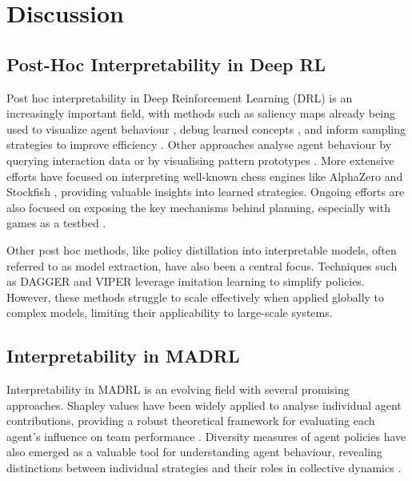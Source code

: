 \section{Discussion}

\subsection{Post-Hoc Interpretability in Deep RL}

Post hoc interpretability in Deep Reinforcement Learning (DRL) is an increasingly important field, with methods such as saliency maps already being used to visualize agent behaviour \cite{Greydanus2017VisualizingAU}, debug learned concepts \cite{Jaderberg2018HumanlevelPI, Hilton2020UnderstandingRV}, and inform sampling strategies to improve efficiency \cite{Bertoin2022LookWY}. Other approaches analyse agent behaviour by querying interaction data \cite{Sequeira2019InterestingnessEF} or by visualising pattern prototypes \cite{Ragodos2022ProtoXEA,Aliciolu2024UseBA}.  More extensive efforts have focused on interpreting well-known chess engines like AlphaZero \cite{McGrath_2022,lovering2022evaluation,hammersborg2023information,schut2023bridging,jenner2024evidencelearnedlookaheadchessplaying,Poupart2024ContrastiveSA} and Stockfish \cite{palsson2023unveiling}, providing valuable insights into learned strategies. Ongoing efforts are also focused on exposing the key mechanisms behind planning, especially with games as a testbed \cite{Jenner2024EvidenceOL,Taufeeque2024PlanningIA,Guei2024InterpretingTL,Chung2024PredictingFA}.

Other post hoc methods, like policy distillation into interpretable models, often referred to as model extraction, have also been a central focus. Techniques such as DAGGER \cite{Ross2010ARO} and VIPER \cite{Bastani2018VerifiableRL} leverage imitation learning to simplify policies. However, these methods struggle to scale effectively when applied globally to complex models, limiting their applicability to large-scale systems.


\subsection{Interpretability in MADRL}

Interpretability in MADRL is an evolving field with several promising approaches. Shapley values have been widely applied to analyse individual agent contributions, providing a robust theoretical framework for evaluating each agent’s influence on team performance \cite{Heuillet2021CollectiveEA,Wang2021SHAQIS,Mahjoub2023EfficientlyQI}. Diversity measures of agent policies have also emerged as a valuable tool for understanding agent behaviour, revealing distinctions between individual strategies and their roles in collective dynamics \cite{Khlifi2023OnDF}.

